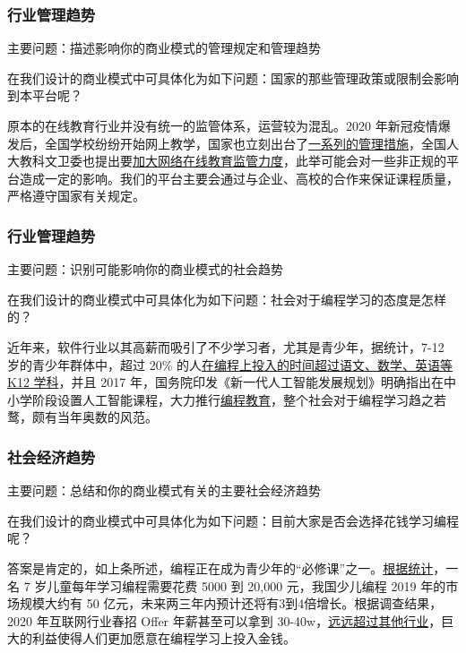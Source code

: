 \documentclass[a4paper]{ctexart}
\begin{document}
\subsubsection{行业管理趋势}
主要问题：描述影响你的商业模式的管理规定和管理趋势

在我们设计的商业模式中可具体化为如下问题：国家的那些管理政策或限制会影响到本平台呢？

原本的在线教育行业并没有统一的监管体系，运营较为混乱。2020 年新冠疫情爆发后，全国学校纷纷开始网上教学，国家也立刻出台了\href{http://news.sciencenet.cn/htmlnews/2020/4/438879.shtm}{一系列的管理措施}，全国人大教科文卫委也提出要\href{http://www.legaldaily.com.cn/index/content/2020-04/07/content_8163684.htm}{加大网络在线教育监管力度}，此举可能会对一些非正规的平台造成一定的影响。我们的平台主要会通过与企业、高校的合作来保证课程质量，严格遵守国家有关规定。

\subsubsection{行业管理趋势}
主要问题：识别可能影响你的商业模式的社会趋势

在我们设计的商业模式中可具体化为如下问题：社会对于编程学习的态度是怎样的？

近年来，软件行业以其高薪而吸引了不少学习者，尤其是青少年，据统计，7-12 岁的青少年群体中，超过 20\% 的人\href{http://scitech.people.com.cn/n1/2020/0327/c1007-31650917.html}{在编程上投入的时间超过语文、数学、英语等 K12 学科}，并且 2017 年，国务院印发《新一代人工智能发展规划》明确指出在中小学阶段设置人工智能课程，大力推行\href{https://www.admin5.com/article/20200410/949348.shtml}{编程教育}，整个社会对于编程学习趋之若鹜，颇有当年奥数的风范。

\subsubsection{社会经济趋势}
主要问题：总结和你的商业模式有关的主要社会经济趋势

在我们设计的商业模式中可具体化为如下问题：目前大家是否会选择花钱学习编程呢？

答案是肯定的，如上条所述，编程正在成为青少年的“必修课”之一。\href{http://www.xinhuanet.com/2019-11/06/c_1125198958.htm}{根据统计}，一名 7 岁儿童每年学习编程需要花费 5000 到 20,000 元，我国少儿编程 2019 年的市场规模大约有 50 亿元，未来两三年内预计还将有3到4倍增长。根据调查结果，2020 年互联网行业春招 Offer 年薪甚至可以拿到 30-40w，\href{https://baijiahao.baidu.com/s?id=1664842639923951399&wfr=spider&for=pc}{远远超过其他行业}，巨大的利益使得人们更加愿意在编程学习上投入金钱。
\end{document}
